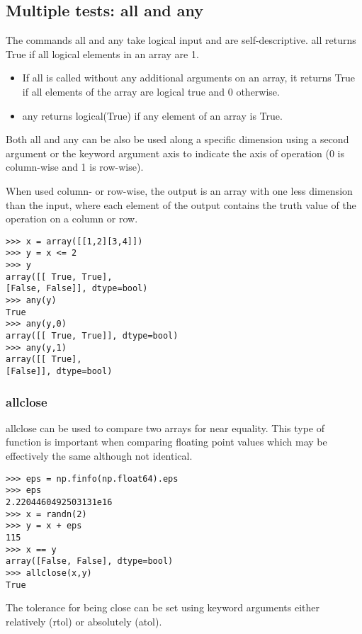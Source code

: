 \documentclass[KSmain.tex]{subfiles}
\begin{document}
\subsection{Multiple tests: all and any}
The commands all and any take logical input and are self-descriptive. all returns True if all logical elements
in an array are 1.
\begin{itemize}
\item  If all is called without any additional arguments on an array, it returns True if all
elements of the array are logical true and 0 otherwise. 
\item 
any returns logical(True) if any element of an array is True.
\end{itemize}
Both all and any can be also be used along a specific dimension using a second argument or the
keyword argument axis to indicate the axis of operation (0 is column-wise and 1 is row-wise). 

When used column- or row-wise, the output is an array with one less dimension than the input, where each element
of the output contains the truth value of the operation on a column or row.
\begin{framed}
\begin{verbatim}
>>> x = array([[1,2][3,4]])
>>> y = x <= 2
>>> y
array([[ True, True],
[False, False]], dtype=bool)
>>> any(y)
True
>>> any(y,0)
array([[ True, True]], dtype=bool)
>>> any(y,1)
array([[ True],
[False]], dtype=bool)
\end{verbatim}
\end{framed}

\subsubsection{allclose}
allclose can be used to compare two arrays for near equality. This type of function is important when
comparing floating point values which may be effectively the same although not identical.
\begin{framed}
\begin{verbatim}
>>> eps = np.finfo(np.float64).eps
>>> eps
2.2204460492503131e16
>>> x = randn(2)
>>> y = x + eps
115
>>> x == y
array([False, False], dtype=bool)
>>> allclose(x,y)
True
\end{verbatim}
\end{framed}
The tolerance for being close can be set using keyword arguments either relatively (rtol) or absolutely
(atol).
\end{document}

